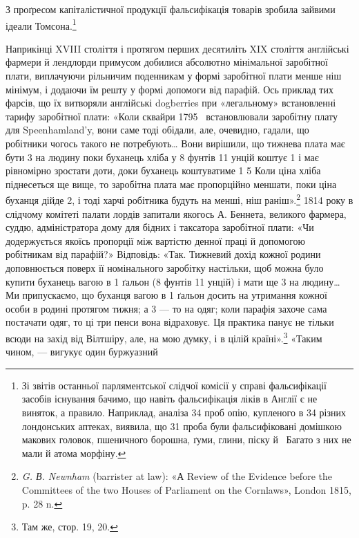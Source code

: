 З проґресом капіталістичної продукції фальсифікація
товарів зробила зайвими ідеали Томсона.\footnote{
Зі звітів останньої парляментської слідчої комісії у справі фальсифікації
засобів існування бачимо, що навіть фальсифікація ліків в
Англії є не виняток, а правило. Наприклад, аналіза 34 проб опію, купленого
в 34 різних лондонських аптеках, виявила, що 31 проба були фальсифіковані
домішкою макових головок, пшеничного борошна, ґуми,
глини, піску й~ Багато з них не мали й атома морфіну.
}

Наприкінці XVIII століття і протягом перших десятиліть
XIX століття англійські фармери й лендлорди примусом добилися
абсолютно мінімальної заробітної плати, виплачуючи рільничим
поденникам у формі заробітної плати менше ніш мінімум,
і додаючи їм решту у формі допомоги від парафій. Ось приклад
тих фарсів, що їх витворяли англійські dogberries при «легальному»
встановленні тарифу заробітної плати: «Коли сквайри
1795~ встановлювали заробітну плату для Speenhamland’y,
вони саме тоді обідали, але, очевидно, гадали, що робітники
чогось такого не потребують\dots{} Вони вирішили, що тижнева
плата має бути 3 на людину поки буханець хліба
у 8 фунтів 11 унцій коштує 1 і має рівномірно зростати
доти, доки буханець коштуватиме 1 5
Коли ціна хліба піднесеться ще вище, то заробітна плата
має пропорційно меншати, поки ціна буханця дійде 2,
і тоді харчі робітника будуть на  менші, ніш раніш».\footnote{
\emph{G. В. Newnham} (barrister at law): «А Review of the Evidence
before the Committees of the two Houses of Parliament on the Cornlaws»,
London 1815, p. 28 n.
}
1814 року в слідчому комітеті палати лордів запитали якогось
А. Беннета, великого фармера, суддю, адміністратора дому для
бідних і таксатора заробітної плати: «Чи додержується якоїсь
пропорції між вартістю денної праці й допомогою робітникам
від парафій?» Відповідь: «Так. Тижневий дохід кожної родини
доповнюється поверх її номінального заробітку настільки, щоб
можна було купити буханець вагою в 1 ґальон (8 фунтів 11 унцій)
і мати ще 3 на людину\dots{} Ми припускаємо, що буханця
вагою в 1 ґальон досить на утримання кожної особи в родині
протягом тижня; а 3 — то на одяг; коли парафія захоче
сама постачати одяг, то ці три пенси вона відраховує. Ця практика
панує не тільки всюди на захід від Вілтшіру, але, на мою
думку, і в цілій країні».\footnote{
Там же, стор. 19, 20.
} «Таким чином, — вигукує один буржуазний
